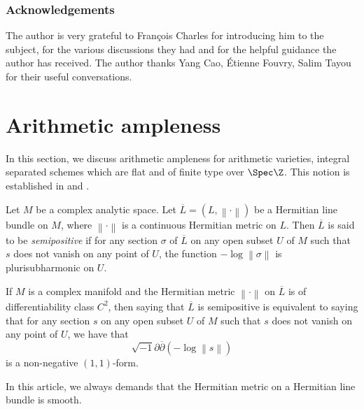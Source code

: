\subsubsection*{Acknowledgements}
The author is very grateful to François Charles for introducing him to the subject, for the various discussions they had and for the helpful guidance the author has received. The author thanks Yang Cao, Étienne Fouvry, Salim Tayou for their useful conversations.

\section{Arithmetic ampleness}\label{arithample}

In this section, we discuss arithmetic ampleness for arithmetic varieties, \ie integral separated schemes which are flat and of finite type over $\Spec \Z$. This notion is established in \cite{Zh92} and \cite{Zh95}.

\begin{defi}
Let $M$ be a complex analytic space. Let $\overline{L}=(L,\left\lVert \cdot \right\rVert)$ be a Hermitian line bundle on $M$, where $\left\lVert \cdot \right\rVert$ is a continuous Hermitian metric on $L$. Then $\overline{L}$ is said to be \emph{semipositive} if for any section $\sigma$ of $\overline{L}$ on any open subset $U$ of $M$ such that $s$ does not vanish on any point of $U$, the function $-\log \left\lVert \sigma \right\rVert$ is plurisubharmonic on $U$.
\end{defi}
\begin{rmq}
If $M$ is a complex manifold and the Hermitian metric $\left\lVert \cdot \right\rVert$ on $\overline{L}$ is of differentiability class $C^2$, then saying that $\overline{L}$ is semipositive is equivalent to saying that for any section $s$ on any open subset $U$ of $M$ such that $s$ does not vanish on any point of $U$, we have that
\[
\sqrt{-1}\partial \overline{\partial}\left(-\log \left\lVert s \right\rVert\right)
\]
is a non-negative $(1,1)$-form.
\end{rmq}
In this article, we always demands that the Hermitian metric on a Hermitian line bundle is smooth.

